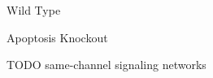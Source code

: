 \begin{figure}[!htbp]
\begin{center}
\vspace{1.0ex}

\hspace*{\fill}%
\begin{minipage}[t]{0.05\columnwidth}
\vspace{0pt} %
\end{minipage}%
\hfill
\begin{minipage}[t]{0.45\columnwidth}
\centering
\vspace{0pt} %
Wild Type
\end{minipage}%
\hfill
\begin{minipage}[t]{0.45\columnwidth}
\centering
\vspace{0pt} %
Apoptosis Knockout
\end{minipage}%
\hspace*{\fill}

\caption{
TODO
same-channel signaling networks
}
\label{fig:ko-apoptosis}
\end{center}
\end{figure}
